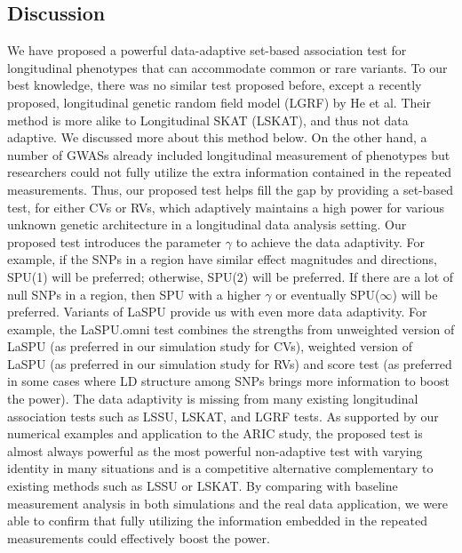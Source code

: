 \documentclass[12pt]{article}
\begin{document}
\subsection{Discussion}
We have proposed a powerful data-adaptive set-based association test for longitudinal phenotypes that can accommodate common or rare variants. To our best knowledge, there was no similar test proposed before, except a recently proposed, longitudinal genetic random field model (LGRF) by He et al.\cite{He2015} Their method is more alike to Longitudinal SKAT (LSKAT), and thus not data adaptive. We discussed more about this method below. On the other hand, a number of GWASs\cite{Aulchenko2009,Ionita-Laza2007,Kamatani2010,Kathiresan2007,Sabatti2008} already included longitudinal measurement of phenotypes but researchers could not fully utilize the extra information contained in the repeated measurements. Thus, our proposed test helps fill the gap by providing a set-based test, for either CVs or RVs, which adaptively maintains a high power for various unknown genetic architecture in a longitudinal data analysis setting. Our proposed test introduces the parameter $\gamma$ to achieve the data adaptivity. For example, if the SNPs in a region have similar effect magnitudes and directions, SPU(1) will be preferred; otherwise, SPU(2) will be preferred. If there are a lot of null SNPs in a region, then SPU with a higher $\gamma$ or eventually SPU($\infty$) will be preferred. Variants of LaSPU provide us with even more data adaptivity. For example, the LaSPU.omni test combines the strengths from unweighted version of LaSPU (as preferred in our simulation study for CVs), weighted version of LaSPU (as preferred in our simulation study for RVs) and score test (as preferred in some cases where LD structure among SNPs brings more information to boost the power). The data adaptivity is missing from many existing longitudinal association tests such as LSSU, LSKAT, and LGRF tests. As supported by our numerical examples and application to the ARIC study, the proposed test is almost always powerful as the most powerful non-adaptive test with varying identity in many situations and is a competitive alternative complementary to existing methods such as LSSU or LSKAT. By comparing with baseline measurement analysis in both simulations and the real data application, we were able to confirm that fully utilizing the information embedded in the repeated measurements could effectively boost the power.
\end{document}
